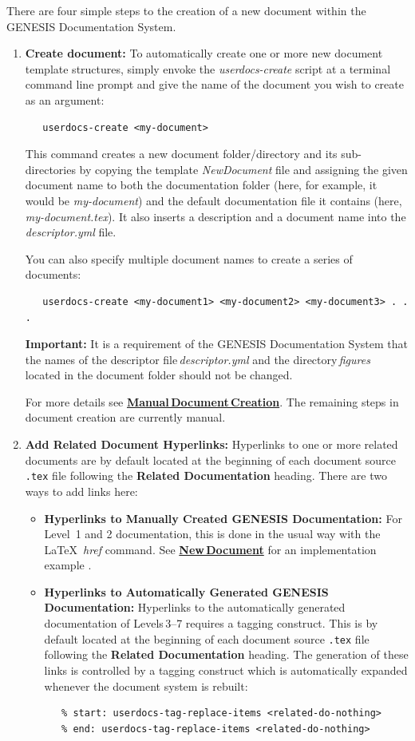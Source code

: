 \documentclass[12pt]{article}
\begin{document}
There are four simple steps to the creation of a new document within the GENESIS Documentation System.

\begin{enumerate}

\item[]{\bf Create document:}  To automatically create one or more new document template structures, simply envoke the {\it userdocs-create} script at a terminal command line prompt and give the name of the document you wish to create as an argument:
\begin{verbatim}
   userdocs-create <my-document>
\end{verbatim}
This command creates a new document folder/directory and its sub-directories by copying the template {\it NewDocument} file and assigning the given document name to both the documentation folder (here, for example, it would be {\it my-document}) and the default documentation file it contains (here, {\it my-document.tex}). It also inserts a description and a document name into the {\it descriptor.yml} file.

You can also specify multiple document names to create a series of documents:
\begin{verbatim}
   userdocs-create <my-document1> <my-document2> <my-document3> . . .
\end{verbatim}
{\bf Important:} It is a requirement of the GENESIS Documentation System that the names of the descriptor file\,{\it descriptor.yml} and the directory\,{\it figures} located in the document folder should not be changed.

For more details see \href{../document-create-manual/document-create-manual.tex}{\bf Manual\,Document\,Creation}. The remaining steps in document creation are currently manual.

\item[]{\bf Add Related Document Hyperlinks:} Hyperlinks to one or more related documents are by default located at the beginning of each document source {\tt .tex} file following the {\bf Related Documentation} heading. There are two ways to add links here:
\begin{itemize}
\item[] {\bf Hyperlinks to Manually Created GENESIS Documentation:} For Level\, 1 and 2 documentation, this is done in the usual way with the \LaTeX\, {\it href} command. See \href{../NewDocument/NewDocument.tex}{\bf New\,Document} for an implementation example .

\item[] {\bf Hyperlinks to Automatically Generated GENESIS Documentation:} Hyperlinks to the automatically generated documentation of Levels\,3--7 requires a tagging construct. This is by default located at the beginning of each document source {\tt .tex} file following the {\bf Related Documentation} heading. The generation of these links is controlled by a tagging construct which is automatically expanded whenever the document system is rebuilt:
\begin{verbatim}
   % start: userdocs-tag-replace-items <related-do-nothing>
   % end: userdocs-tag-replace-items <related-do-nothing>
\end{verbatim}


\end{itemize}
\end{enumerate}
\end{document}
